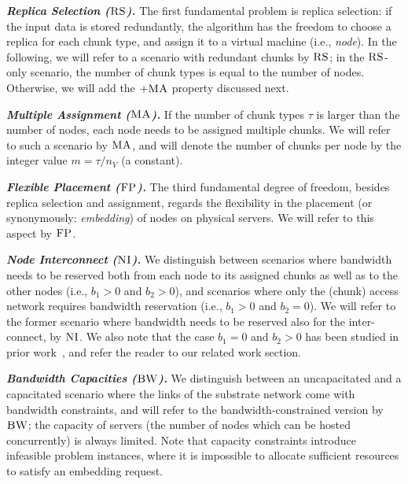 \documentclass[9pt]{sigcomm-alternate}
\newcommand{\MaFactor}{m}
\newcommand{\capa}{\emph{cap}}
\newcommand{\CC}{\textsc{NI}}
\newcommand{\FP}{\textsc{FP}}
\newcommand{\RS}{\textsc{RS}}
\newcommand{\BW}{\textsc{BW}}
\newcommand{\MA}{\textsc{MA}}
\newcommand{\CostTrans}{\ensuremath{b_1}}
\newcommand{\CostCom}{\ensuremath{b_2}}
\begin{document}
\textbf{\emph{Replica Selection ($\RS$).}} The first fundamental problem is replica selection:
if the input data is stored redundantly, the algorithm has the freedom to choose a replica
for each chunk type, and assign it to a virtual machine (i.e., \emph{node}).
In the following, we will refer to a scenario
with redundant chunks by $\RS$; in the $\RS$-only scenario, the number of chunk types
is equal to the number of nodes. Otherwise, we will add the $+\MA$ property discussed next.

\textbf{\emph{Multiple Assignment ($\MA$).}}
If the number of chunk types $\tau$ is larger than the number of nodes,
each node needs to be assigned multiple chunks. We will refer to such a scenario by $\MA$,
and will denote the number of chunks per node by the integer value $\MaFactor = \tau / n_V$ (a constant).


\textbf{\emph{Flexible Placement ($\FP$).}} The third fundamental degree of freedom, besides replica selection and assignment,
regards the flexibility in the placement (or synonymously: \emph{embedding}) of nodes on physical servers.
We will refer to this aspect by $\FP$.

\textbf{\emph{Node Interconnect ($\CC$).}} We distinguish between scenarios
where bandwidth needs to be reserved
both from each node to its assigned chunks as well as to the other nodes
(i.e., $\CostTrans>0$ and $\CostCom>0$), and
 scenarios where only the (chunk) access network requires bandwidth reservation (i.e., $\CostTrans>0$ and $\CostCom=0$).
 We will refer to the former scenario
where bandwidth needs to be reserved also for the inter-connect, by $\CC$.
We also note that the case $\CostTrans=0$ and $\CostCom>0$ has been studied in prior work~\cite{oktopus,talk-about,proteus},
and refer the reader to our related work section.


\textbf{\emph{Bandwidth Capacities ($\BW$).}}
We distinguish between an uncapacitated and a capacitated scenario where the links
of the substrate network come with bandwidth
constraints, and will refer to the bandwidth-constrained version by $\BW$; the capacity of servers
(the number of nodes which can be hosted concurrently) is always limited.
Note that capacity constraints introduce infeasible problem instances, where it is impossible to
allocate sufficient resources to satisfy an embedding request.


\end{document}

